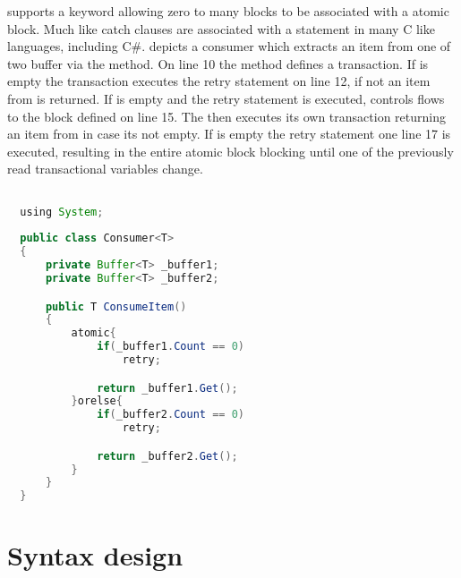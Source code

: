 \stmnamesp supports a  keyword allowing zero to many  blocks to be associated with a atomic block. Much like catch clauses are associated with a  statement in many C like languages, including C\#\cite[p. 96]{sestoft2011c}.  depicts a consumer which extracts an item from one of two buffer via the  method. On line 10 the  method defines a transaction. If  is empty the transaction executes the retry statement on line 12, if not an item from  is returned. If  is empty and the retry statement is executed, controls flows to the  block defined on line 15. The  then executes its own transaction returning an item from  in case its not empty. If  is empty the retry statement one line 17 is executed, resulting in the entire atomic block blocking until one of the previously read transactional variables change.

\begin{lstlisting}[label=lst:stm_atomic_syntax_orelse,
  caption={OrElse Syntax},
  language=Java,  
  showspaces=false,
  showtabs=false,
  breaklines=true,
  showstringspaces=false,
  breakatwhitespace=true,
  commentstyle=\color{greencomments},
  keywordstyle=\color{bluekeywords},
  stringstyle=\color{redstrings},
  morekeywords={atomic, retry, orelse, var, get, set, using}]  % Start your code-block

  using System;
  
  public class Consumer<T>
  {
      private Buffer<T> _buffer1;
      private Buffer<T> _buffer2;

      public T ConsumeItem()
      {
          atomic{
              if(_buffer1.Count == 0)
                  retry;

              return _buffer1.Get();
          }orelse{
              if(_buffer2.Count == 0)
                  retry;

              return _buffer2.Get();
          }
      }
  }
\end{lstlisting}

\section{Syntax design}


%
%
%
%    
%
%    
         
         

\worksheetend
